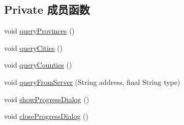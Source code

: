 \subsection*{Private 成员函数}
\begin{DoxyCompactItemize}
\item 
void \mbox{\hyperlink{classcom_1_1example_1_1akisame__lin_1_1love__air2_1_1weather_1_1_choose_area_fragment_a4c46acb1a5416ffb369c713ea948accd}{query\+Provinces}} ()
\item 
void \mbox{\hyperlink{classcom_1_1example_1_1akisame__lin_1_1love__air2_1_1weather_1_1_choose_area_fragment_a048bd053fc11b3ac5a566e3c1c1fe0a3}{query\+Cities}} ()
\item 
void \mbox{\hyperlink{classcom_1_1example_1_1akisame__lin_1_1love__air2_1_1weather_1_1_choose_area_fragment_a9d49812d1568e4039418186987856609}{query\+Counties}} ()
\item 
void \mbox{\hyperlink{classcom_1_1example_1_1akisame__lin_1_1love__air2_1_1weather_1_1_choose_area_fragment_aa86f7dd2387ca6e0eb2cc7581af33b08}{query\+From\+Server}} (String address, final String type)
\item 
void \mbox{\hyperlink{classcom_1_1example_1_1akisame__lin_1_1love__air2_1_1weather_1_1_choose_area_fragment_a591e834b1e10279c7deede1e303e086e}{show\+Progress\+Dialog}} ()
\item 
void \mbox{\hyperlink{classcom_1_1example_1_1akisame__lin_1_1love__air2_1_1weather_1_1_choose_area_fragment_a2d8a3645cd87247717fb632442355641}{close\+Progress\+Dialog}} ()
\end{DoxyCompactItemize}
